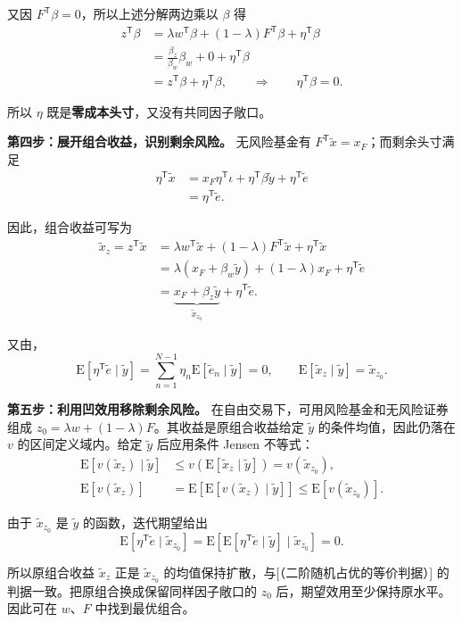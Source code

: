 \begin{solution}[label-content={证明},blank-type=none]
又因 $F^{\mathsf T}\beta=0$，所以上述分解两边乘以 $\beta$ 得
\[
\begin{aligned}
 z^{\mathsf T}\beta
 &=\lambda w^{\mathsf T}\beta+(1-\lambda)F^{\mathsf T}\beta
   +\eta^{\mathsf T}\beta\\
 &=\frac{\beta_z}{\beta_w}\beta_w+0+\eta^{\mathsf T}\beta\\
 &=z^{\mathsf T}\beta+\eta^{\mathsf T}\beta,
 \qquad\Longrightarrow\qquad \eta^{\mathsf T}\beta=0.
\end{aligned}
\]

所以 $\eta$ 既是\textbf{零成本头寸}，又没有共同因子敞口。

\textbf{第四步：展开组合收益，识别剩余风险。}
无风险基金有 $F^{\mathsf T}\tilde x=x_F$；而剩余头寸满足
\[
\begin{aligned}
 \eta^{\mathsf T}\tilde x
 &=x_F\eta^{\mathsf T}\iota+\eta^{\mathsf T}\beta\tilde y
   +\eta^{\mathsf T}\tilde e\\
 &=\eta^{\mathsf T}\tilde e.
\end{aligned}
\]

因此，组合收益可写为
\[
\begin{aligned}
 \tilde x_z=z^{\mathsf T}\tilde x
 &=\lambda w^{\mathsf T}\tilde x+(1-\lambda)F^{\mathsf T}\tilde x
   +\eta^{\mathsf T}\tilde x\\
 &=\lambda(x_F+\beta_w\tilde y)+(1-\lambda)x_F
   +\eta^{\mathsf T}\tilde e\\
 &=\underbrace{x_F+\beta_z\tilde y}_{\tilde x_{z_0}}
   +\eta^{\mathsf T}\tilde e.
\end{aligned}
\]

又由，
\[
 \mathrm E[\eta^{\mathsf T}\tilde e\mid\tilde y]
 =\sum_{n=1}^{N-1}\eta_n\mathrm E[\tilde e_n\mid\tilde y]=0,
 \qquad
 \mathrm E[\tilde x_z\mid\tilde y]=\tilde x_{z_0}.
\]

\textbf{第五步：利用凹效用移除剩余风险。}
在自由交易下，可用风险基金和无风险证券组成 $z_0=\lambda w+(1-\lambda)F$。其收益是原组合收益给定 $\tilde y$ 的条件均值，因此仍落在 $v$ 的区间定义域内。给定 $\tilde y$ 后应用条件 Jensen 不等式：
\[
\begin{aligned}
 \mathrm E[v(\tilde x_z)\mid\tilde y]
 &\le v\!\left(\mathrm E[\tilde x_z\mid\tilde y]\right)
 =v(\tilde x_{z_0}),\\
 \mathrm E[v(\tilde x_z)]
 &=\mathrm E\!\left[\mathrm E[v(\tilde x_z)\mid\tilde y]\right]
 \le\mathrm E[v(\tilde x_{z_0})].
\end{aligned}
\]

由于 $\tilde x_{z_0}$ 是 $\tilde y$ 的函数，迭代期望给出
\[
 \mathrm E[\eta^{\mathsf T}\tilde e\mid\tilde x_{z_0}]
 =\mathrm E\!\left[\mathrm E[\eta^{\mathsf T}\tilde e\mid\tilde y]
                   \mid\tilde x_{z_0}\right]=0.
\]

所以原组合收益 $\tilde x_z$ 正是 $\tilde x_{z_0}$ 的均值保持扩散，与[（二阶随机占优的等价判据）] 的判据一致。把原组合换成保留同样因子敞口的 $z_0$ 后，期望效用至少保持原水平。因此可在 $w$、$F$ 中找到最优组合。
\end{solution}


